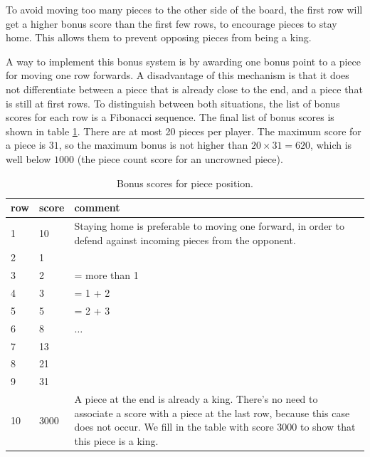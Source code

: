 \documentclass[11pt,a4paper]{article}
\begin{document}
To avoid moving too many pieces to the other side of the board, the first row will get a higher bonus score than the first few rows, to encourage pieces to stay home. This allows them to prevent opposing pieces from being a king.

A way to implement this bonus system is by awarding one bonus point to a piece for moving one row forwards. A disadvantage of this mechanism is that it does not differentiate between a piece that is already close to the end, and a piece that is still at first rows. To distinguish between both situations, the list of bonus scores for each row is a Fibonacci sequence. The final list of bonus scores is shown in table \ref{table:bonusscore}. There are at most 20 pieces per player. The maximum score for a piece is $31$, so the maximum bonus is not higher than $20\times 31 = 620$, which is well below $1000$ (the piece count score for an uncrowned piece).

\begin{table}[ht]
\begin{tabularx}{\linewidth}{l|l|X}
row & score & comment \\
\hline
1 & 10 & Staying home is preferable to moving one forward, in order to defend against incoming pieces from the opponent. \\
2 & 1 & \\
3 & 2 & = more than 1 \\
4 & 3 & = 1 + 2\\
5 & 5 & = 2 + 3\\
6 & 8 & $\dots$\\
7 & 13 & \\
8 & 21 & \\
9 & 31 & \\
10 & 3000 & A piece at the end is already a king. There's no need to associate a score with a piece at the last row, because this case does not occur. We fill in the table with score 3000 to show that this piece is a king. \\
\end{tabularx}
\caption{Bonus scores for piece position.}\label{table:bonusscore}
\end{table}
\end{document}
